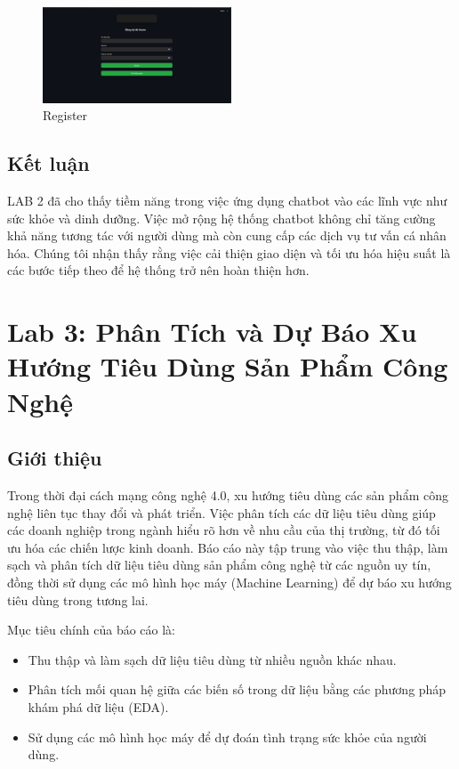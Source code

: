 \documentclass[a4paper,12pt]{report}
\begin{document}
\begin{figure}[h]
    \centering
    \includegraphics[width=0.5\textwidth]{image/register.png}
    \caption{Register}
    \label{fig:register}
\end{figure}

\section{Kết luận}
LAB 2 đã cho thấy tiềm năng trong việc ứng dụng chatbot vào các lĩnh vực như sức khỏe và dinh dưỡng. Việc mở rộng hệ thống chatbot không chỉ tăng cường khả năng tương tác với người dùng mà còn cung cấp các dịch vụ tư vấn cá nhân hóa. Chúng tôi nhận thấy rằng việc cải thiện giao diện và tối ưu hóa hiệu suất là các bước tiếp theo để hệ thống trở nên hoàn thiện hơn.

\chapter{Lab 3: Phân Tích và Dự Báo Xu Hướng Tiêu Dùng Sản Phẩm Công Nghệ}

\section{Giới thiệu}
Trong thời đại cách mạng công nghệ 4.0, xu hướng tiêu dùng các sản phẩm công nghệ liên tục thay đổi và phát triển. Việc phân tích các dữ liệu tiêu dùng giúp các doanh nghiệp trong ngành hiểu rõ hơn về nhu cầu của thị trường, từ đó tối ưu hóa các chiến lược kinh doanh. Báo cáo này tập trung vào việc thu thập, làm sạch và phân tích dữ liệu tiêu dùng sản phẩm công nghệ từ các nguồn uy tín, đồng thời sử dụng các mô hình học máy (Machine Learning) để dự báo xu hướng tiêu dùng trong tương lai.

Mục tiêu chính của báo cáo là:
\begin{itemize}
    \item Thu thập và làm sạch dữ liệu tiêu dùng từ nhiều nguồn khác nhau.
    \item Phân tích mối quan hệ giữa các biến số trong dữ liệu bằng các phương pháp khám phá dữ liệu (EDA).
    \item Sử dụng các mô hình học máy để dự đoán tình trạng sức khỏe của người dùng.

\end{itemize}
\end{document}
